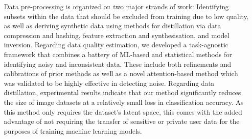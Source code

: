 \documentclass{manolo}
\begin{document}
Data pre-processing is organized on two major strands of work:
Identifying subsets within the data that should be excluded from
training due to low quality, as well as deriving synthetic data using
methods for distillation via data compression and hashing, feature
extraction and synthesisation, and model inversion.
%
Regarding data quality estimation, we developed a task-agnostic framework
that combines a battery of ML-based and statistical methods for identifying
noisy and inconsistent data. These include both refinements and calibrations
of prior methods as well as a novel attention-based method which was
validated to be highly effective in detecting noise.
%
Regarding data
distillation, experimental results indicate that our method significantly
reduces the size of image datasets at a relatively small loss in
classification accuracy. As this method only requires the dataset's
latent space, this comes with the added advantage of not requiring the
transfer of sensitive or private user data for the purposes of training
machine learning models.

\clearpage


\end{document}
